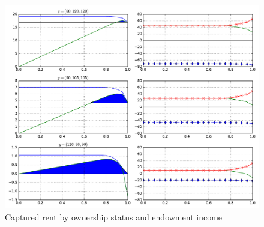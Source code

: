 \documentclass[11pt,english]{article}
\theoremstyle{plain}
\theoremstyle{definition}
\begin{document}
\begin{figure}
  \includegraphics[width=1\textwidth]{fig_nonprofits.pdf}
  \caption{\label{fig:nonprofit}Captured rent by ownership status and endowment
income}

\end{figure}
\end{document}
